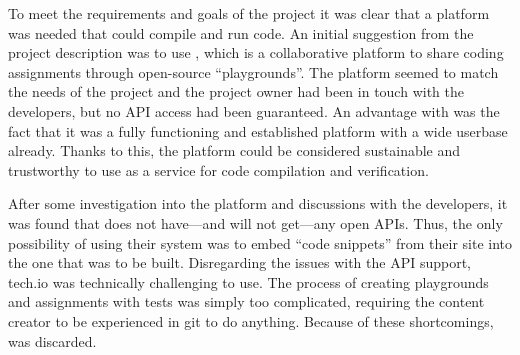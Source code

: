 To meet the requirements and goals of the project it was clear that a platform was needed that could compile and run code. An initial suggestion from the project description was to use \techio{}, which is a collaborative platform to share coding assignments through open-source ``playgrounds''. The platform seemed to match the needs of the project and the project owner had been in touch with the developers, but no API access had been guaranteed. An advantage with \techio{} was the fact that it was a fully functioning and established platform with a wide userbase already. Thanks to this, the platform could be considered sustainable and trustworthy to use as a service for code compilation and verification.

After some investigation into the platform and discussions with the developers, it was found that \techio{} does not have---and will not get---any open APIs. Thus, the only possibility of using their system was to  embed ``code snippets'' from their site into the one that was to be built. Disregarding the issues with the API support, tech.io was technically challenging to use. The process of creating playgrounds and assignments with tests was simply too complicated, requiring the content creator to be experienced in git to do anything. Because of these shortcomings, \techio{} was discarded.

